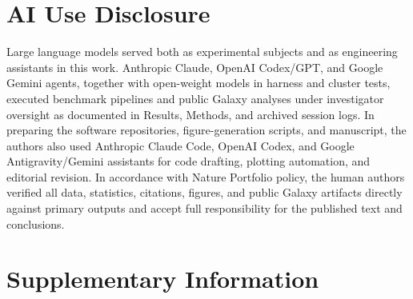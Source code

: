\documentclass[11pt,letterpaper]{article}
\begin{document}
\section*{AI Use Disclosure}
Large language models served both as experimental subjects and as engineering assistants in this work. Anthropic Claude, OpenAI Codex/GPT, and Google Gemini agents, together with open-weight models in harness and cluster tests, executed benchmark pipelines and public Galaxy analyses under investigator oversight as documented in Results, Methods, and archived session logs. In preparing the software repositories, figure-generation scripts, and manuscript, the authors also used Anthropic Claude Code, OpenAI Codex, and Google Antigravity/Gemini assistants for code drafting, plotting automation, and editorial revision. In accordance with Nature Portfolio policy, the human authors verified all data, statistics, citations, figures, and public Galaxy artifacts directly against primary outputs and accept full responsibility for the published text and conclusions.




\clearpage
\appendix
\renewcommand{\thefigure}{S\arabic{figure}}
\renewcommand{\theHfigure}{S\arabic{figure}}
\setcounter{figure}{0}
\renewcommand{\thetable}{S\arabic{table}}
\renewcommand{\theHtable}{S\arabic{table}}
\setcounter{table}{0}

\section*{Supplementary Information}
\end{document}
